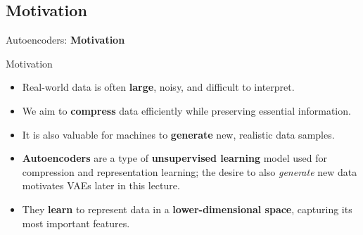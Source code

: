 \subsection{Motivation}
\begin{frame}{}
    \LARGE Autoencoders: \textbf{Motivation}
\end{frame}

\begin{frame}{Motivation}
    \begin{itemize}
        \item Real-world data is often \textbf{large}, noisy, and difficult to interpret.
        \item We aim to \textbf{compress} data efficiently while preserving essential information.
        \item It is also valuable for machines to \textbf{generate} new, realistic data samples.
        \item \textbf{Autoencoders} are a type of \textbf{unsupervised learning} model used for compression and representation learning; the desire to also \emph{generate} new data motivates VAEs later in this lecture.
        \item They \textbf{learn} to represent data in a \textbf{lower-dimensional space}, capturing its most important features.
    \end{itemize}
\end{frame}